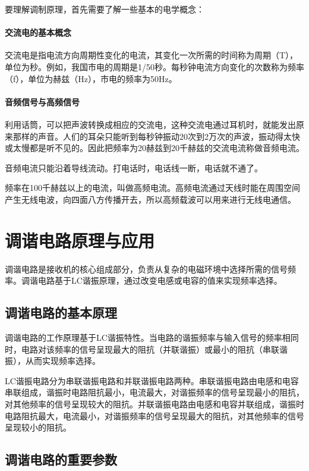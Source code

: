 \documentclass[12pt,UTF8]{ctexbook}
\begin{document}
要理解调制原理，首先需要了解一些基本的电学概念：

\subsubsection{交流电的基本概念}
交流电是指电流方向周期性变化的电流，其变化一次所需的时间称为周期（T），单位为秒。例如，我国市电的周期是1/50秒。每秒钟电流方向变化的次数称为频率（f），单位为赫兹（Hz），市电的频率为50Hz。

\subsubsection{音频信号与高频信号}
利用话筒，可以把声波转换成相应的交流电，这种交流电通过耳机时，就能发出原来那样的声音。人们的耳朵只能听到每秒钟振动20次到2万次的声波，振动得太快或太慢都是听不见的。因此把频率为20赫兹到20千赫兹的交流电流称做音频电流。

音频电流只能沿着导线流动。打电话时，电话线一断，电话就不通了。

频率在100千赫兹以上的电流，叫做高频电流。高频电流通过天线时能在周围空间产生无线电波，向四面八方传播开去，所以高频载波可以用来进行无线电通信。

\chapter{调谐电路原理与应用}

调谐电路是接收机的核心组成部分，负责从复杂的电磁环境中选择所需的信号频率。调谐电路基于LC谐振原理，通过改变电感或电容的值来实现频率选择。

\section{调谐电路的基本原理}

调谐电路的工作原理基于LC谐振特性。当电路的谐振频率与输入信号的频率相同时，电路对该频率的信号呈现最大的阻抗（并联谐振）或最小的阻抗（串联谐振），从而实现频率选择。

LC谐振电路分为串联谐振电路和并联谐振电路两种。串联谐振电路由电感和电容串联组成，谐振时电路阻抗最小，电流最大，对谐振频率的信号呈现最小的阻抗，对其他频率的信号呈现较大的阻抗。并联谐振电路由电感和电容并联组成，谐振时电路阻抗最大，电流最小，对谐振频率的信号呈现最大的阻抗，对其他频率的信号呈现较小的阻抗。

\section{调谐电路的重要参数}
\end{document}
